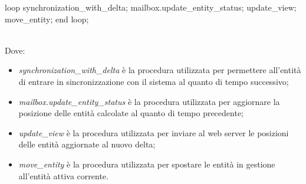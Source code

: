 \begin{codiceada}[caption={Template-Code entità attiva}, label=template-code]
loop
	synchronization_with_delta;
	mailbox.update_entity_status;	
	update_view;	
	move_entity;
end loop;
\end{codiceada}
\\
Dove:
\begin{itemize}
\item \textit{synchronization\_with\_delta} è la procedura utilizzata per
permettere all'entità di entrare in sincronizzazione con il sistema al quanto
di tempo successivo;
\item \textit{mailbox.update\_entity\_status} è la procedura utilizzata per
aggiornare la posizione delle entità calcolate al quanto di tempo precedente;
\item \textit{update\_view} è la procedura utilizzata per inviare al web server
le posizioni delle entità aggiornate al nuovo delta;
\item \textit{move\_entity} è la procedura utilizzata per spostare le entità
in gestione all'entità attiva corrente.
\end{itemize}

